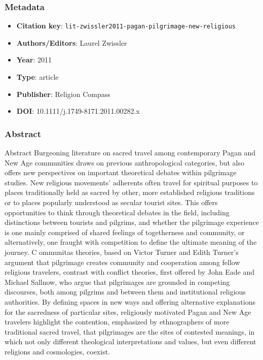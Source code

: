 \subsubsection*{Metadata}
\begin{itemize}
  \item \textbf{Citation key}: \texttt{lit-zwissler2011-pagan-pilgrimage-new-religious}
  \item \textbf{Authors/Editors}: Laurel Zwissler
  \item \textbf{Year}: 2011
  \item \textbf{Type}: article
  \item \textbf{Publisher}: Religion Compass
  \item \textbf{DOI}: 10.1111/j.1749-8171.2011.00282.x
\end{itemize}
\subsubsection*{Abstract}
Abstract Burgeoning literature on sacred travel among contemporary Pagan and New Age communities draws on previous anthropological categories, but also offers new perspectives on important theoretical debates within pilgrimage studies. New religious movements’ adherents often travel for spiritual purposes to places traditionally held as sacred by other, more established religious traditions or to places popularly understood as secular tourist sites. This offers opportunities to think through theoretical debates in the field, including distinctions between tourists and pilgrims, and whether the pilgrimage experience is one mainly comprised of shared feelings of togetherness and community, or alternatively, one fraught with competition to define the ultimate meaning of the journey. C ommunitas theories, based on Victor Turner and Edith Turner’s argument that pilgrimage creates community and cooperation among fellow religious travelers, contrast with conflict theories, first offered by John Eade and Michael Sallnow, who argue that pilgrimages are grounded in competing discourses, both among pilgrims and between them and institutional religious authorities. By defining spaces in new ways and offering alternative explanations for the sacredness of particular sites, religiously motivated Pagan and New Age travelers highlight the contention, emphasized by ethnographers of more traditional sacred travel, that pilgrimages are the sites of contested meanings, in which not only different theological interpretations and values, but even different religions and cosmologies, coexist.

